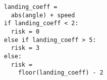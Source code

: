 \begin{marginlisting}
\begin{lstlisting}[language=customPython]
landing_coeff =
  abs(angle) + speed
if landing_coeff < 2:
  risk = 0
else if landing_coeff > 5:
  risk = 3
else:
  risk =
    floor(landing_coeff) - 2
\end{lstlisting}
\end{marginlisting}
